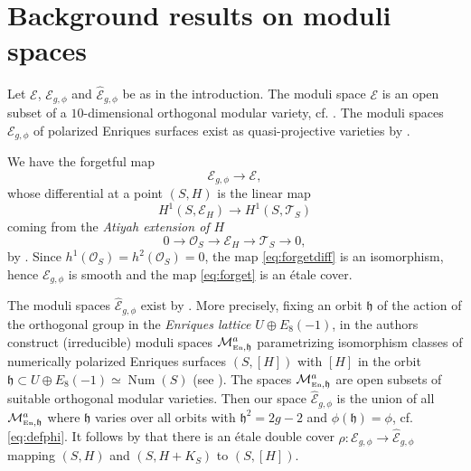\documentclass[11pt]{amsart}
\theoremstyle{definition}
\def\M{{\mathcal M}}
\def\O{{\mathcal O}}
\def\E{{\mathcal E}}
\def\T{{\mathcal T}}
\def\cong{\simeq}
\def\+{\oplus}               %
\def\Num{\operatorname{Num}}
\begin{document}
\section{ Background results on moduli spaces} \label{sec:gen00}



 Let $\E$, $\E_{g,\phi}$ and  $\widehat{\E}_{g,\phi}$ be as in the introduction. The moduli space $\E$ is an open subset of a $10$-dimensional orthogonal modular variety, cf. \cite[{VIII \S 19-21}]{BHPV}. The moduli spaces $\E_{g,\phi}$ of polarized Enriques surfaces exist as quasi-projective varieties by \cite[Thm. 1.13]{Vie}. 

We  have   the  forgetful  map 
\begin{equation} \label{eq:forget}
\E_{g,\phi} \longrightarrow \E, 
\end{equation}
whose differential at a point $(S,H)$ is the linear map 
\begin{equation} \label{eq:forgetdiff}
 H^1(S,\E_H) \longrightarrow H^1(S,\T_S) 
\end{equation}
coming from the {\it Atiyah extension of $H$}
\[ 0 \longrightarrow \O_S \longrightarrow \E_H  \longrightarrow \T_S \longrightarrow 0, \]
by \cite[Prop. 3.3.12]{Ser}. Since $h^1(\O_S)=h^2(\O_S)=0$, the map \eqref{eq:forgetdiff} is an isomorphism, hence $\E_{g,\phi}$ is smooth and the map \eqref{eq:forget} is an \'etale cover. 

 
The moduli spaces $\widehat{\E}_{g,\phi}$ exist by \cite{GrHu}. More precisely,
fixing an orbit  $\mathfrak{h}$ of the
action of the orthogonal group in the {\it Enriques lattice} $U \+ E_8(-1)$,
 in \cite{GrHu} the authors construct (irreducible) moduli spaces $\M^a_{\tiny{\mbox{En}},\mathfrak{h}}$ parametrizing isomorphism classes of numerically polarized Enriques surfaces $(S,[H])$ with $[H]$ in the orbit $ \mathfrak{h} \subset U \+ E_8(-1) \cong \Num(S)$ (see  \cite[Lemma VIII.15.1]{BHPV}). The spaces $\M^a_{\tiny{\mbox{En}},\mathfrak{h}}$ are open subsets of suitable orthogonal modular varieties.
Then our space $\widehat{\E}_{g,\phi}$ is the union of all $\M^a_{\tiny{\mbox{En}},\mathfrak{h}}$ where $\mathfrak{h}$ varies over all orbits 
with $\mathfrak{h}^2=2g-2$ and $\phi(\mathfrak{h})=\phi$, cf. \eqref{eq:defphi}. 
 It follows by \cite[Prop. 4.1]{GrHu} that there is an étale double cover $\rho: \E_{g,\phi} \to
\widehat{\E}_{g,\phi}$ mapping 
$(S,H)$ and $(S,H+K_S)$ to $(S,[H])$. 
\end{document}
